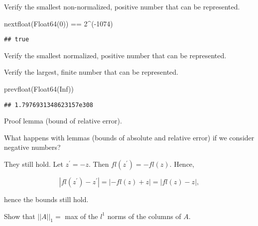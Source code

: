 \documentclass[]{book}
\newenvironment{Shaded}{\begin{snugshade}}{\end{snugshade}}
\newcommand{\DataTypeTok}[1]{\textcolor[rgb]{0.13,0.29,0.53}{#1}}
\newcommand{\FloatTok}[1]{\textcolor[rgb]{0.00,0.00,0.81}{#1}}
\newcommand{\NormalTok}[1]{#1}
\theoremstyle{definition}
\theoremstyle{definition}
\theoremstyle{definition}
\theoremstyle{remark}
\let\BeginKnitrBlock\begin \let\EndKnitrBlock\end
\begin{document}
\BeginKnitrBlock{exercise}
\protect\hypertarget{exr:q206}{}{\label{exr:q206} }Verify the smallest
non-normalized, positive number that can be represented.
\EndKnitrBlock{exercise}

\begin{Shaded}
\begin{Highlighting}[]
\NormalTok{nextfloat(}\DataTypeTok{Float64}\NormalTok{(}\FloatTok{0}\NormalTok{)) == }\FloatTok{2}\NormalTok{^(-}\FloatTok{1074}\NormalTok{)}
\end{Highlighting}
\end{Shaded}

\begin{verbatim}
## true
\end{verbatim}

\BeginKnitrBlock{exercise}
\protect\hypertarget{exr:q207}{}{\label{exr:q207} }Verify the smallest
normalized, positive number that can be represented.
\EndKnitrBlock{exercise}

\BeginKnitrBlock{exercise}
\protect\hypertarget{exr:q208}{}{\label{exr:q208} }Verify the largest,
finite number that can be represented.
\EndKnitrBlock{exercise}

\begin{Shaded}
\begin{Highlighting}[]
\NormalTok{prevfloat(}\DataTypeTok{Float64}\NormalTok{(Inf))}
\end{Highlighting}
\end{Shaded}

\begin{verbatim}
## 1.7976931348623157e308
\end{verbatim}

\BeginKnitrBlock{exercise}
\protect\hypertarget{exr:q209}{}{\label{exr:q209} }Proof lemma (bound of
relative error).
\EndKnitrBlock{exercise}

\BeginKnitrBlock{exercise}
\protect\hypertarget{exr:q210}{}{\label{exr:q210} }What happens with lemmas
(bounds of absolute and relative error) if we consider negative numbers?
\EndKnitrBlock{exercise}

\BeginKnitrBlock{solution}
\iffalse{} {Solution. } \fi{}They still hold. Let \(z^\prime = -z\).
Then \(fl(z^\prime) = -fl(z)\). Hence,

\[
  \left| fl(z^\prime) - z^\prime \right | = \left | -fl(z) + z \right | = \left | fl(z) - z \right |,
\]

hence the bounds still hold.
\EndKnitrBlock{solution}

\BeginKnitrBlock{exercise}
\protect\hypertarget{exr:q211}{}{\label{exr:q211} }Show that
\(\left|\left| A \right|\right|_1 =\) max of the \(l^1\) norms of the
columns of \(A\).
\EndKnitrBlock{exercise}
\end{document}
